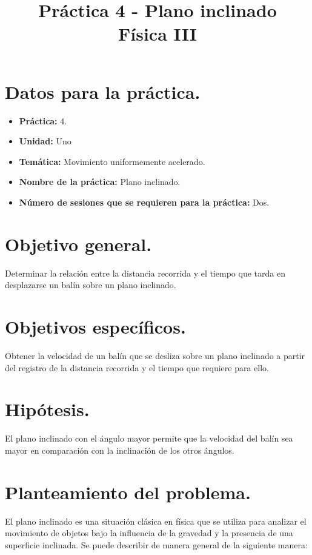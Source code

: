 \documentclass[14pt]{extarticle}
\title{\vspace*{-2cm} Práctica 4 - Plano inclinado \\  Física III\vspace{-5ex}}
\date{}
\begin{document}
\maketitle


\section{Datos para la práctica.}

\begin{itemize}
\itemsep0em 
\item  \textbf{Práctica:} 4.
\item \textbf{Unidad:} Uno
\item \textbf{Temática:} Movimiento uniformemente acelerado.
\item \textbf{Nombre de la práctica:} Plano inclinado.
\item \textbf{Número de sesiones que se requieren para la práctica:} Dos.
\end{itemize}

\section{Objetivo general.}

Determinar la relación entre la distancia recorrida y el tiempo que tarda en desplazarse un balín sobre un plano inclinado.

\section{Objetivos específicos.}

Obtener la velocidad de un balín que se desliza sobre un plano inclinado a partir del registro de la distancia recorrida y el tiempo que requiere para ello.

\section{Hipótesis.}

El plano inclinado con el ángulo mayor permite que la velocidad del balín sea mayor en comparación con la inclinación de los otros ángulos.

\section{Planteamiento del problema.}

El plano inclinado es una situación clásica en física que se utiliza para analizar el movimiento de objetos bajo la influencia de la gravedad y la presencia de una superficie inclinada. Se puede describir de manera general de la siguiente manera:
\end{document}
